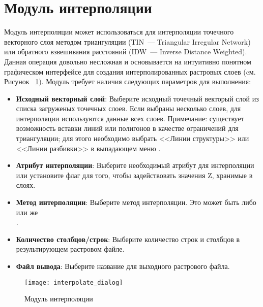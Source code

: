 
\section{Модуль интерполяции}\label{sec:interpol}


Модуль интерполяции может использоваться для интерполяции точечного векторного слоя
методом триангуляции (TIN~--- Triangular Irregular
Network) или обратного взвешивания расстояний (IDW~--- Inverse Distance
Weighted). Данная операция довольно несложная и основывается на интуитивно понятном графическом
интерфейсе для создания интерполированных растровых слоев (cм. Рисунок~
\ref{fig:interpolation_dialog}). Модуль требует наличия следующих
параметров для выполнения:

\begin{itemize}[label=--]
\item \textbf{Исходный векторный слой}: Выберите исходный точечный
векторый слой из списка загруженых точечных слоев. Если выбраны
несколько слоев, для интерполяции используются данные всех слоев.
Примечание: существует возможность вставки линий или полигонов в
качестве ограничений для триангуляции; для этого необходимо выбрать
<<Линии структуры>> или <<Линии разбивки>> в выпадающем меню
.
\item \textbf{Атрибут интерполяции}: Выберите необходимый атрибут
для интерполяции или установите флаг
 для того, чтобы
задействовать значения Z, хранимые в слоях.
\item \textbf{Метод интерполяции}: Выберите метод интерполяции. Это
может быть либо \\
 или же \\
.
\item \textbf{Количество столбцов/строк}: Выберите количество строк и
столбцов в результирующем растровом файле.
\item \textbf{Файл вывода}: Выберите название для выходного растрового
файла.
\end{itemize}

\begin{figure}[ht]
   \centering
   \texttt{[image: interpolate\_dialog]}
   \caption{Модуль интерполяции \wincaption}\label{fig:interpolation_dialog}
\end{figure}

